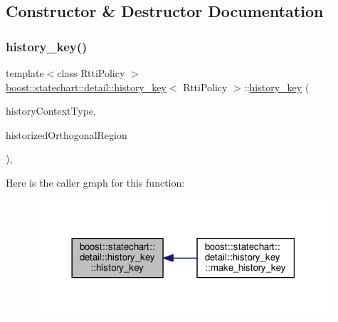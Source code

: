 \subsection{Constructor \& Destructor Documentation}
\mbox{\label{classboost_1_1statechart_1_1detail_1_1history__key_a3a82daf417809c2f96ab4be96f982d6d}} 
\subsubsection{\texorpdfstring{history\+\_\+key()}{history\_key()}}
{\footnotesize\ttfamily template$<$class Rtti\+Policy $>$ \\
\mbox{\hyperlink{classboost_1_1statechart_1_1detail_1_1history__key}{boost\+::statechart\+::detail\+::history\+\_\+key}}$<$ Rtti\+Policy $>$\+::\mbox{\hyperlink{classboost_1_1statechart_1_1detail_1_1history__key}{history\+\_\+key}} (\begin{DoxyParamCaption}\item[{typename Rtti\+Policy\+::id\+\_\+type}]{history\+Context\+Type,  }\item[{\mbox{\hyperlink{namespaceboost_1_1statechart_1_1detail_a3bedea0b807a16fa222733417183d2c9}{orthogonal\+\_\+position\+\_\+type}}}]{historized\+Orthogonal\+Region }\end{DoxyParamCaption})\hspace{0.3cm}{\ttfamily [inline]}, {\ttfamily [private]}}

Here is the caller graph for this function\+:
\nopagebreak
\begin{figure}[H]
\begin{center}
\leavevmode
\includegraphics[width=314pt]{classboost_1_1statechart_1_1detail_1_1history__key_a3a82daf417809c2f96ab4be96f982d6d_icgraph}
\end{center}
\end{figure}



